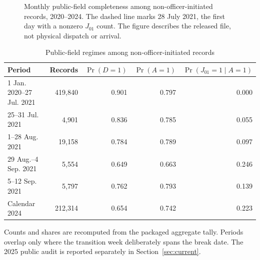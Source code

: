 \documentclass[11pt]{article}
\begin{document}
\begin{figure}[t]
\centering
{}
\caption{Monthly public-field completeness among non-officer-initiated records, 2020--2024. The dashed line marks 28 July 2021, the first day with a nonzero $J_{01}$ count. The figure describes the released file, not physical dispatch or arrival.}
\label{fig:monthly}
\end{figure}

\begin{table}[t]
\centering
\caption{Public-field regimes among non-officer-initiated records}
\label{tab:regimes}
\begin{tabular}{@{}lrrrr@{}}
\toprule
Period & Records & $\Pr(D=1)$ & $\Pr(A=1)$ & $\Pr(J_{01}=1\mid A=1)$ \\
\midrule
1 Jan. 2020--27 Jul. 2021 & 419,840 & 0.901 & 0.797 & 0.000 \\
25--31 Jul. 2021 & 4,901 & 0.836 & 0.785 & 0.055 \\
1--28 Aug. 2021 & 19,158 & 0.784 & 0.789 & 0.097 \\
29 Aug.--4 Sep. 2021 & 5,554 & 0.649 & 0.663 & 0.246 \\
5--12 Sep. 2021 & 5,797 & 0.762 & 0.793 & 0.139 \\
Calendar 2024 & 212,314 & 0.654 & 0.742 & 0.223 \\
\bottomrule
\end{tabular}
\begin{minipage}{0.94\textwidth}\footnotesize
Counts and shares are recomputed from the packaged aggregate tally. Periods overlap only where the transition week deliberately spans the break date. The 2025 public audit is reported separately in Section~\ref{sec:current}.
\end{minipage}
\end{table}
\end{document}
